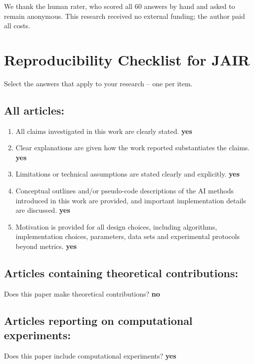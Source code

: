 \documentclass[manuscript, screen, review]{jair}
\begin{document}


\begin{acks}
We thank the human rater, who scored all 60 answers by hand and asked to remain anonymous.
This research received no external funding; the author paid all costs.
\end{acks}

\printbibliography

\appendix



\section{Reproducibility Checklist for JAIR}

Select the answers that apply to your research -- one per item.

\subsection*{All articles:}

\begin{enumerate}
    \item All claims investigated in this work are clearly stated.
    \textbf{yes}
    \item Clear explanations are given how the work reported substantiates the claims.
    \textbf{yes}
    \item Limitations or technical assumptions are stated clearly and explicitly.
    \textbf{yes}
    \item Conceptual outlines and/or pseudo-code descriptions of the AI methods introduced in this work are provided, and important implementation details are discussed.
    \textbf{yes}
    \item
    Motivation is provided for all design choices, including algorithms, implementation choices, parameters, data sets and experimental protocols beyond metrics.
    \textbf{yes}
\end{enumerate}

\subsection*{Articles containing theoretical contributions:}
Does this paper make theoretical contributions?
\textbf{no}

\subsection*{Articles reporting on computational experiments:}
Does this paper include computational experiments? \textbf{yes}
\end{document}
